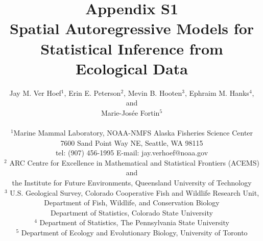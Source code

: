 \documentclass[11pt, titlepage]{article}\usepackage[]{graphicx}\usepackage[]{color}
\begin{document}

\titlepage
\title {\textbf{Appendix S1} \\ Spatial Autoregressive Models for Statistical Inference from Ecological Data}
\author{Jay M. Ver Hoef$^1$, Erin E. Peterson$^2$, Mevin B. Hooten$^3$, Ephraim M. Hanks$^4$, and \\
	Marie-Jos\'{e}e Fortin$^5$ \\
\hrulefill \\ 
$^1$Marine Mammal Laboratory, NOAA-NMFS Alaska Fisheries Science Center\\
7600 Sand Point Way NE, Seattle, WA 98115\\
tel: (907) 456-1995 \hspace{.5cm} E-mail: jay.verhoef@noaa.gov\\
$^2$ ARC Centre for Excellence in Mathematical and Statistical Frontiers (ACEMS) and \\
the Institute for Future Environments, Queensland University of Technology \\ 
$^3$ U.S. Geological Survey, Colorado Cooperative Fish and Wildlife Research Unit, \\
Department of Fish, Wildlife, and Conservation Biology \\
Department of Statistics, Colorado State University \\
$^4$ Department of Statistics, The Pennsylvania State University \\
$^5$ Department of Ecology and Evolutionary Biology, University of Toronto \\
\hrulefill \\
}

\maketitle

\end{document}
